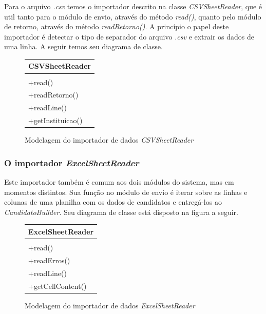 \documentclass[
	12pt,			%
	openright,		%
	oneside,	
	a4paper,		%
	english,		%
	brazil			%
]{abntex2/abntex2}  %
\begin{document}
	Para o arquivo \textit{.csv} temos o importador descrito na classe \textit{CSVSheetReader}, que é util tanto para o módulo de envio, através do método \textit{read()}, quanto pelo módulo de retorno, através do método \textit{readRetorno()}. A princípio o papel deste importador é detectar o tipo de separador do arquivo \textit{.csv} e extrair os dados de uma linha. A seguir temos seu diagrama de classe.
	
	\begin{figure}[H]
		\begin{center}
			
			\caption{Modelagem do importador de dados \textit{CSVSheetReader}}
			\label{csvreader-uml}
			
			\begin{tabular}{|l|}
				\hline
				\multicolumn{1}{|c|}{\textbf{CSVSheetReader}} \\ \hline
				\\ \hline
				+read() \\
				+readRetorno() \\
				+readLine() \\
				+getInstituicao() \\ \hline
			\end{tabular}
			
		\end{center}
	\end{figure}
	
	\subsubsection{O importador \textit{ExcelSheetReader}}

	Este importador também é comum aos dois módulos do sistema, mas em momentos distintos. Sua função no módulo de envio é iterar sobre as linhas e colunas de uma planilha com os dados de candidatos e entregá-los ao \textit{CandidatoBuilder}. Seu diagrama de classe está disposto na figura a seguir.

	\begin{figure}[H]
		\begin{center}
			
			\caption{Modelagem do importador de dados \textit{ExcelSheetReader}}
			\label{excelreader-uml}
			
			\begin{tabular}{|l|}
				\hline
				\multicolumn{1}{|c|}{\textbf{ExcelSheetReader}} \\ \hline
				\\ \hline
				+read() \\
				+readErros() \\
				+readLine() \\
				+getCellContent() \\ \hline
			\end{tabular}
			
		\end{center}
	\end{figure}
	
\end{document}
